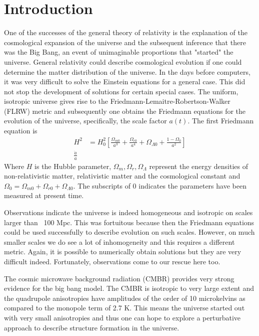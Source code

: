 \documentclass[12pt,a4paper,oneside]{book}
\begin{document}
	\section{Introduction}
		One of the successes of the general theory of relativity is the explanation of the cosmological expansion of the universe and the subsequent inference that there was the Big Bang, an event of unimaginable proportions that "started" the universe. General relativity could describe cosmological evolution if one could determine the matter distribution of the universe. In the days before computers, it was very difficult to solve the Einstein equations for a general case. This did not stop the development of solutions for certain special cases. The uniform, isotropic universe gives rise to the Friedmann-Lemaitre-Robertson-Walker (FLRW) metric and subsequently one obtains the Friedmann equations for the evolution of the universe, specifically, the scale factor $a(t)$. The first Friedmann equation is
		\begin{equation}
			\begin{aligned}
				H^2&=H_0^2\left[\frac{\Omega_{m0}}{a^3}+
													\frac{{\Omega}_{r0}}{a^4}+
													{\Omega}_{\Lambda 0}+
													\frac{1-\Omega_0}{a^2}\right]\\
				\frac{\ddot{a}}{a}
			\end{aligned}
		\end{equation}
		Where $H$ is the Hubble parameter, $\Omega_{m},\Omega_{r},\Omega_{\Lambda}$ represent the energy densities of non-relativistic matter, relativistic matter and the cosmological constant and $\Omega_0=\Omega_{m0}+\Omega_{r0}+\Omega_{\Lambda 0}$. The subscripts of 0 indicates the parameters have been measured at present time.
		
		Observations indicate the universe is indeed homogeneous and isotropic on scales larger than ~100 Mpc. This was fortuitous because then the Friedmann equations could be used successfully to describe evolution on such scales. However, on much smaller scales we do see a lot of inhomogeneity and this requires a different metric. Again, it is possible to numerically obtain solutions but they are very difficult indeed. Fortunately, observations come to our rescue here too.
		
		The cosmic microwave background radiation (CMBR) provides very strong evidence for the big bang model. The CMBR is isotropic to very large extent and the quadrupole anisotropies have amplitudes of the order of 10 microkelvins as compared to the monopole term of 2.7 K. This means the universe started out with very small anisotropies and thus one can hope to explore a perturbative approach to describe structure formation in the universe.
		
\end{document}
